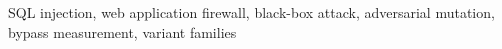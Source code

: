 \begin{IEEEkeywords}
SQL injection, web application firewall, black-box attack, adversarial mutation, bypass measurement, variant families
\end{IEEEkeywords}
